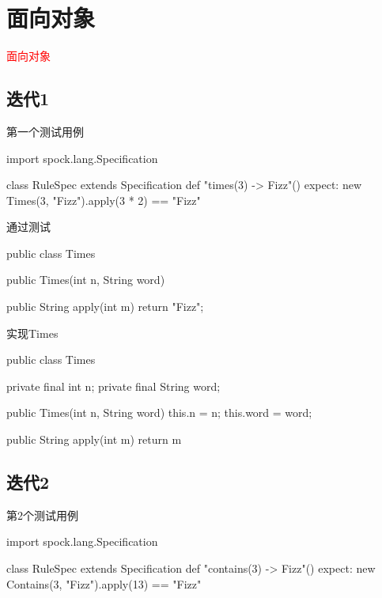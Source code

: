 \section{面向对象}
\label{sec:oo}

\begin{frame}
  \begin{center}
    \Huge{\textcolor{red}{面向对象}}
  \end{center}
\end{frame}

\subsection{迭代1}

\begin{frame}[fragile]{第一个测试用例}
  \begin{scala}
import spock.lang.Specification

class RuleSpec extends Specification {
  def "times(3) -> Fizz"() {
    expect:
    new Times(3, "Fizz").apply(3 * 2) == "Fizz"
  }
}
  \end{scala}
\end{frame}

\begin{frame}[fragile]{通过测试}
  \begin{java}
public class Times {
  public Times(int n, String word) {
  }

  public String apply(int m) {
    return "Fizz";
  }
}
  \end{java}
\end{frame}

\begin{frame}[fragile]{实现Times}
  \begin{java}
public class Times {
  private final int n;
  private final String word;

  public Times(int n, String word) {
    this.n = n;
    this.word = word;
  }

  public String apply(int m) {
    return m %
  }
}
  \end{java}
\end{frame}

\subsection{迭代2}

\begin{frame}[fragile]{第2个测试用例}
  \begin{scala}
import spock.lang.Specification

class RuleSpec extends Specification {
  def "contains(3) -> Fizz"() {
    expect:
    new Contains(3, "Fizz").apply(13) == "Fizz"
  }
}
  \end{scala}
\end{frame}

